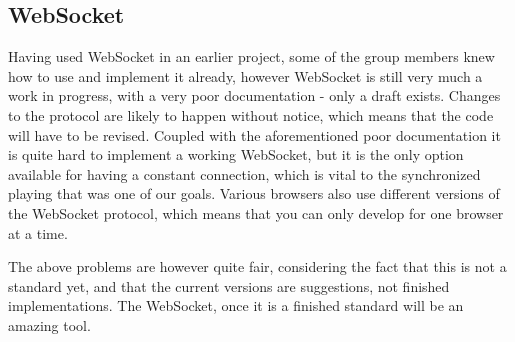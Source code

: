 \subsection{WebSocket}
Having used WebSocket in an earlier project, some of the group members knew how to use and implement it already, however
WebSocket is still very much a work in progress, with a very poor documentation - only a draft exists. Changes to the protocol
are likely to happen without notice, which means that the code will have to be revised. Coupled with the aforementioned poor
documentation it is quite hard to implement a working WebSocket, but it is the only option available for having a constant
connection, which is vital to the synchronized playing that was one of our goals. Various browsers also use different versions
of the WebSocket protocol, which means that you can only develop for one browser at a time. 

The above problems are however quite fair, considering the fact that this is not a standard yet, and that the current versions are suggestions, not finished implementations. The WebSocket, once it is a finished standard will be an amazing tool.